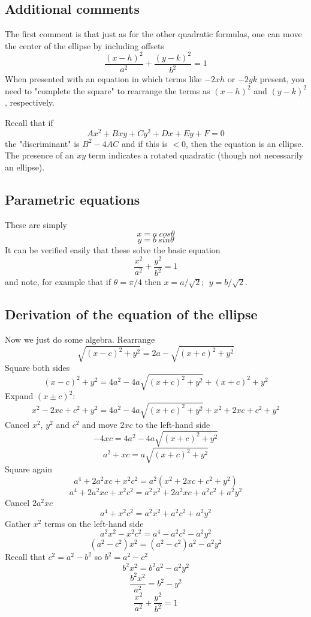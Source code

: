 \documentclass[11pt, oneside]{article}   	%
\begin{document}
\subsection*{Additional comments}
The first comment is that just as for the other quadratic formulas, one can move the center of the ellipse by including offsets
\[ \frac{(x-h)^2}{a^2} + \frac{(y-k)^2}{b^2} = 1 \]
When presented with an equation in which terms like $-2xh$ or $-2yk$ present, you need to "complete the square" to rearrange the terms as $(x-h)^2$ and $(y-k)^2$, respectively.

Recall that if
\[ Ax^2 + Bxy + Cy^2 + Dx + Ey + F =0 \]
the "discriminant" is $B^2 - 4AC$ and if this is $<0$, then the equation is an ellipse.  The presence of an $xy$ term indicates a rotated quadratic (though not necessarily an ellipse).

\subsection*{Parametric equations}
These are simply
\[ x = a \ cos\theta \]
\[ y = b \ sin\theta \]
It can be verified easily that these solve the basic equation
\[ \frac{x^2}{a^2} + \frac{y^2}{b^2} = 1 \]
and note, for example that if $\theta=\pi/4$ then $x = a/\sqrt{2}; \ \ y = b/\sqrt{2}$.


\subsection*{Derivation of the equation of the ellipse}

Now we just do some algebra.  Rearrange
\[ \sqrt{(x - c)^2 + y^2} = 2a - \sqrt{(x + c)^2 + y^2} \]
Square both sides
\[ (x - c)^2 + y^2 = 4a^2 - 4a \sqrt{(x + c)^2 + y^2} + (x+c)^2 + y^2 \]
Expand $(x \pm c)^2$:
\[ x^2 - 2xc + c^2 + y^2 = 4a^2 - 4a \sqrt{(x + c)^2 + y^2} + x^2 + 2xc + c^2 + y^2 \]
Cancel $x^2$, $y^2$ and $c^2$ and move $2xc$ to the left-hand side
\[ -4xc = 4a^2 - 4a \sqrt{(x + c)^2 + y^2} \]
\[ a^2 + xc = a \sqrt{(x + c)^2 + y^2} \]
Square again
\[ a^4 + 2a^2xc + x^2c^2 = a^2(x^2 + 2xc + c^2 + y^2) \]
\[ a^4 + 2a^2xc + x^2c^2 = a^2x^2 + 2a^2xc + a^2c^2 + a^2y^2 \]
Cancel $2a^2xc$
\[ a^4 + x^2c^2 = a^2x^2 + a^2c^2 + a^2y^2 \]
Gather $x^2$ terms on the left-hand side
\[ a^2x^2 - x^2c^2 = a^4 - a^2c^2 - a^2y^2 \]
\[ (a^2 - c^2)x^2 = (a^2 - c^2)a^2 - a^2y^2  \]
Recall that $c^2 = a^2 - b^2$ so $b^2 = a^2 - c^2$
\[ b^2x^2 = b^2a^2 - a^2y^2  \]
\[ \frac{b^2x^2}{a^2} = b^2 - y^2  \]
\[ \frac{x^2}{a^2} + \frac{y^2}{b^2} = 1  \]
\end{document}
